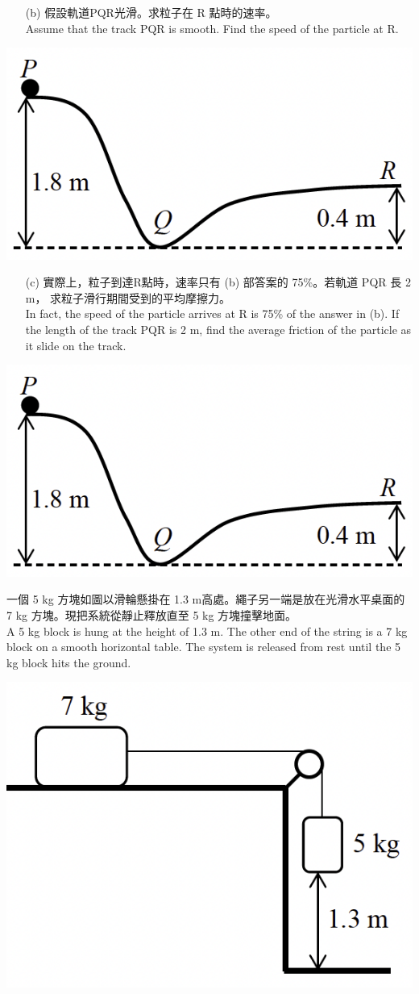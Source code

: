 \documentclass[beamer=true]{standalone}
\begin{document}
\begin{eg}
    \begin{itemize}
        \item [(b)] 假設軌道PQR光滑。求粒子在 R 點時的速率。 \\Assume that the track PQR is smooth. Find the speed of the particle at R.
    \end{itemize}{\par\raggedleft
    \includegraphics[width=.4\textwidth]{assets/047b1413.png}
    \par}
\end{eg}

\begin{eg}
    \begin{itemize}
        \item[(c)] 實際上，粒子到達R點時，速率只有 (b) 部答案的 75\%。若軌道 PQR 長 2 m， 求粒子滑行期間受到的平均摩擦力。 \\In fact, the speed of the particle arrives at R is 75\% of the answer in (b). If the length of the track PQR is 2 m, find the average friction of the particle as it slide on the track.
    \end{itemize}{\par\raggedleft
    \includegraphics[width=.4\textwidth]{assets/047b1413.png}
    \par}
\end{eg}

\begin{eg}
    一個 5 kg 方塊如圖以滑輪懸掛在 1.3 m高處。繩子另一端是放在光滑水平桌面的 7 kg 方塊。現把系統從靜止釋放直至 5 kg 方塊撞擊地面。 \\A 5 kg block is hung at the height of 1.3 m. The other end of the string is a 7 kg block on a smooth horizontal table. The system is released from rest until the 5 kg block hits the ground.
        {\par\centering
            \includegraphics[width=.35\textwidth]{assets/8a2c64de.png}
            \par}
\end{eg}
\end{document}
